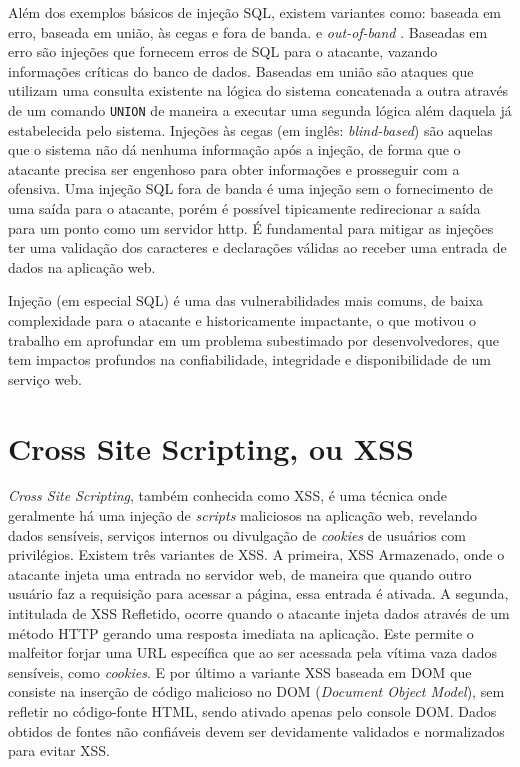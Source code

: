 Além dos exemplos básicos de injeção SQL, existem variantes \cite{bach_owasp2020understanding} como: baseada em erro, baseada em união, às cegas e fora de banda. e \textit{out-of-band} \cite{out_of_band_sql_invicti}. Baseadas em erro são injeções que fornecem erros de SQL para o atacante, vazando informações críticas do banco de dados. Baseadas em união são ataques que utilizam uma consulta existente na lógica do sistema concatenada a outra através de um comando \verb+UNION+ de maneira a executar uma segunda lógica além daquela já estabelecida pelo sistema. Injeções às cegas (em inglês: \textit{blind-based}) são aquelas que o sistema não dá nenhuma informação após a injeção, de forma que o atacante precisa ser engenhoso para obter informações e prosseguir com a ofensiva. Uma injeção SQL fora de banda  é uma injeção sem o fornecimento de uma saída para o atacante, porém é possível tipicamente redirecionar a saída para um ponto como um servidor http.
É fundamental para mitigar as injeções ter uma validação dos caracteres e declarações válidas ao receber uma entrada de dados na aplicação web.

Injeção (em especial SQL) é uma das vulnerabilidades mais comuns, de baixa complexidade para o atacante e historicamente impactante, o que motivou o trabalho em aprofundar em um problema subestimado por desenvolvedores, que tem impactos profundos na confiabilidade, integridade e disponibilidade de um serviço web.

\section{Cross Site Scripting, ou XSS}
\textit{Cross Site Scripting}, também conhecida como XSS, é uma técnica onde geralmente há uma injeção de \textit{scripts} maliciosos na aplicação web, revelando dados sensíveis, serviços internos ou divulgação de \textit{cookies} de usuários com privilégios.
Existem três variantes de XSS. A primeira, XSS Armazenado, onde o atacante injeta uma entrada no servidor web, de maneira que quando outro usuário faz a requisição para acessar a página, essa entrada é ativada. A segunda, intitulada de XSS Refletido, ocorre quando o atacante injeta dados através de um método HTTP gerando uma resposta imediata na aplicação. Este permite o malfeitor forjar uma URL específica que ao ser acessada pela vítima vaza dados sensíveis, como \textit{cookies}. E por último a variante XSS baseada em DOM que consiste na inserção de código malicioso no DOM (\textit{Document Object Model}), sem refletir no código-fonte HTML, sendo ativado apenas pelo console DOM.
Dados obtidos de fontes não confiáveis devem ser devidamente validados e normalizados para evitar XSS.

